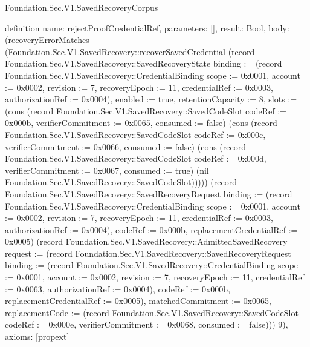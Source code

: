 \begin{lexlean}{Foundation.Sec.V1.SavedRecoveryCorpus}
\begin{semanticmodule}
definition{
  name: rejectProofCredentialRef,
  parameters: [],
  result: Bool,
  body: (recoveryErrorMatches (Foundation.Sec.V1.SavedRecovery::recoverSavedCredential (record Foundation.Sec.V1.SavedRecovery::SavedRecoveryState {binding := (record Foundation.Sec.V1.SavedRecovery::CredentialBinding {scope := 0x0001, account := 0x0002, revision := 7, recoveryEpoch := 11, credentialRef := 0x0003, authorizationRef := 0x0004}), enabled := true, retentionCapacity := 8, slots := (cons (record Foundation.Sec.V1.SavedRecovery::SavedCodeSlot {codeRef := 0x000b, verifierCommitment := 0x0065, consumed := false}) (cons (record Foundation.Sec.V1.SavedRecovery::SavedCodeSlot {codeRef := 0x000c, verifierCommitment := 0x0066, consumed := false}) (cons (record Foundation.Sec.V1.SavedRecovery::SavedCodeSlot {codeRef := 0x000d, verifierCommitment := 0x0067, consumed := true}) (nil Foundation.Sec.V1.SavedRecovery::SavedCodeSlot))))}) (record Foundation.Sec.V1.SavedRecovery::SavedRecoveryRequest {binding := (record Foundation.Sec.V1.SavedRecovery::CredentialBinding {scope := 0x0001, account := 0x0002, revision := 7, recoveryEpoch := 11, credentialRef := 0x0003, authorizationRef := 0x0004}), codeRef := 0x000b, replacementCredentialRef := 0x0005}) (record Foundation.Sec.V1.SavedRecovery::AdmittedSavedRecovery {request := (record Foundation.Sec.V1.SavedRecovery::SavedRecoveryRequest {binding := (record Foundation.Sec.V1.SavedRecovery::CredentialBinding {scope := 0x0001, account := 0x0002, revision := 7, recoveryEpoch := 11, credentialRef := 0x0063, authorizationRef := 0x0004}), codeRef := 0x000b, replacementCredentialRef := 0x0005}), matchedCommitment := 0x0065, replacementCode := (record Foundation.Sec.V1.SavedRecovery::SavedCodeSlot {codeRef := 0x000e, verifierCommitment := 0x0068, consumed := false})})) 9),
  axioms: [propext]
}


\end{semanticmodule}
\end{lexlean}
